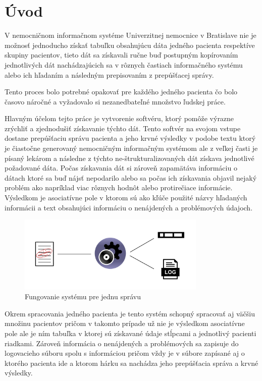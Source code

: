 \chapter*{Úvod} %

V nemocničnom informačnom systéme Univerzitnej nemocnice v Bratislave nie je možnosť jednoducho získať tabuľku obsahujúcu dáta jedného pacienta respektíve skupiny pacientov, tieto dát sa získavali ručne buď postupným kopírovaním jednotlivých dát nachádzajúcich sa v rôznych častiach informačného systému alebo ich hľadaním a následným prepisovaním z prepúšťacej správy.

Tento proces bolo potrebné opakovať pre každého jedného pacienta čo bolo časovo náročné a vyžadovalo si nezanedbateľné množstvo ľudskej práce.

Hlavným účelom tejto práce je vytvorenie softvéru, ktorý pomôže výrazne zrýchliť a zjednodušiť získavanie týchto dát. Tento softvér na svojom vstupe dostane prepúšťaciu správu pacienta a jeho krvné výsledky v podobe textu ktorý je čiastočne generovaný nemocničným informačným systémom ale z veľkej časti je písaný lekárom a následne z týchto ne-štrukturalizovaných dát získava jednotlivé požadované dáta. Počas získavania dát si zároveň zapamätáva informáciu o dátach ktoré sa buď nájsť nepodarilo alebo sa počas ich získavania objavil nejaký problém ako napríklad viac rôznych hodnôt alebo protirečiace informácie. Výsledkom je asociatívne pole v ktorom sú ako kľúče použité názvy hľadaných informácii a text obsahujúci informáciu o nenájdených a problémových údajoch. 

\begin{figure}
	\centerline{\includegraphics[width=0.8\textwidth]{images/system_jedna_sprava}}
	\caption[Fungovanie systému pre jednu správu]{Fungovanie systému pre jednu správu}
	\label{obr:systemJedna}
\end{figure}
\newpage
Okrem spracovania jedného pacienta je tento systém schopný spracovať aj väčšiu množinu pacientov pričom v takomto prípade už nie je výsledkom asociatívne pole ale je ním tabuľka v ktorej sú získavané údaje stĺpcami a jednotlivý pacienti riadkami. Zároveň informácia o nenájdených a problémových sa zapisuje do logovacieho súboru spolu s informáciou pričom vždy je v súbore zapísané aj o ktorého pacienta ide a ktorom hárku sa nachádza jeho prepúšťacia správa a krvné výsledky.

